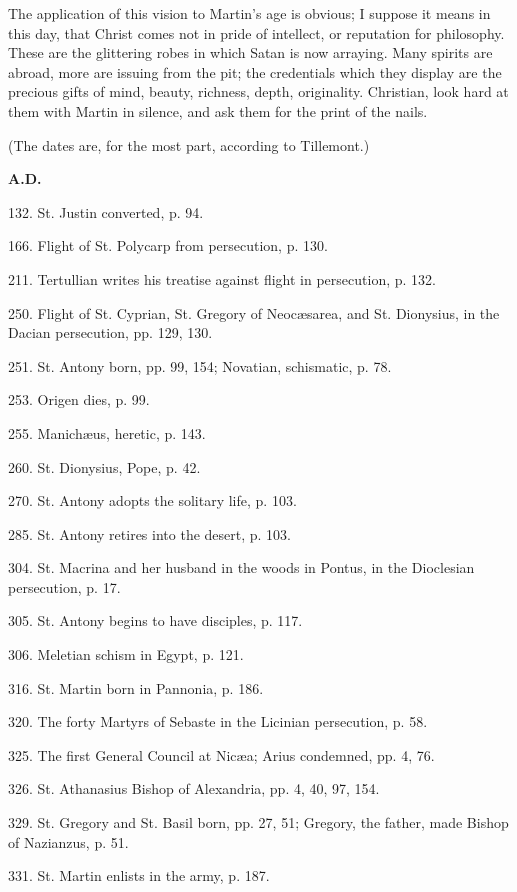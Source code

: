 The application of this vision to Martin's age is obvious; I
suppose it means in this day, that Christ comes not in pride of
intellect, or reputation for philosophy. These are the glittering
robes in which Satan is now arraying. Many spirits are abroad, more
are issuing from the pit; the credentials which they display are the
precious gifts of mind, beauty, richness, depth, originality.
Christian, look hard at them with Martin in silence, and ask them for
the print of the nails.


(The dates are, for the most part, according
to Tillemont.)

\textbf{A.D.}

132.
St. Justin converted, p. 94.

166.
Flight of St. Polycarp from persecution, p.
130.

211.
Tertullian writes his treatise against flight
in persecution, p. 132.

250.
Flight of St. Cyprian, St. Gregory of
Neocæsarea, and St. Dionysius, in the Dacian persecution, pp.
129, 130.

251.
St. Antony born, pp. 99, 154; Novatian,
schismatic, p. 78.

253.
Origen dies, p. 99.

255.
Manichæus, heretic, p. 143.

260.
St. Dionysius, Pope, p. 42.

270.
St. Antony adopts the solitary life, p. 103.

285.
St. Antony retires into the desert, p. 103.

304.
St. Macrina and her husband in the woods in
Pontus, in the Dioclesian persecution, p. 17.

305.
St. Antony begins to have disciples, p. 117.

306.
Meletian schism in Egypt, p. 121.

316.
St. Martin born in Pannonia, p. 186.

320.
The forty Martyrs of Sebaste in the Licinian
persecution, p. 58.

325.
The first General Council at Nicæa; Arius
condemned, pp. 4, 76.

326.
St. Athanasius Bishop of Alexandria, pp. 4, 40,
97, 154.

329.
St. Gregory and St. Basil born, pp. 27, 51;
Gregory, the father, made Bishop of Nazianzus, p. 51.

331.
St. Martin enlists in the army, p. 187.

